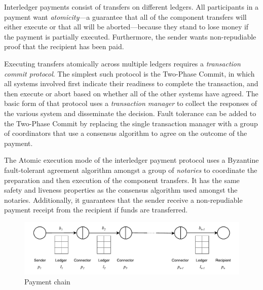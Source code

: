 \documentclass[letterpaper,twocolumn,10pt]{article}
\begin{document}


Interledger payments consist of transfers on different ledgers. All participants in a payment want \textit{atomicity}---a guarantee that all of the component transfers will either execute or that all will be aborted---because they stand to lose money if the payment is partially executed. Furthermore, the sender wants non-repudiable proof that the recipient has been paid.

Executing transfers atomically across multiple ledgers requires a \textit{transaction commit protocol}. The simplest such protocol is the Two-Phase Commit, in which all systems involved first indicate their readiness to complete the transaction, and then execute or abort based on whether all of the other systems have agreed. The basic form of that protocol uses a \textit{transaction manager} to collect the responses of the various system and disseminate the decision. Fault tolerance can be added to the Two-Phase Commit by replacing the single transaction manager with a group of coordinators that use a consensus algorithm to agree on the outcome of the payment. \cite{gray2006consensus}

The Atomic execution mode of the interledger payment protocol uses a Byzantine fault-tolerant agreement algorithm amongst a group of \textit{notaries} to coordinate the preparation and then execution of the component transfers. It has the same safety and liveness properties as the consensus algorithm used amongst the notaries. Additionally, it guarantees that the sender receive a non-repudiable payment receipt from the recipient if funds are transferred.


\begin{figure}[th!]
    \centering
    \includegraphics[width=\textwidth]{figures/payment-chain.pdf}
    \caption{Payment chain}
    \label{fig:n-bells}
\end{figure}
\end{document}

